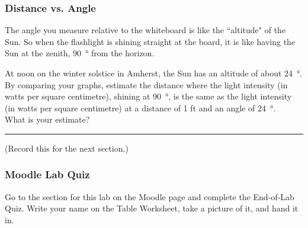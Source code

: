 \documentclass[main.tex]{subfiles}
\begin{document}
\subsubsection{Distance vs. Angle}
The angle you measure relative to the whiteboard is like the ``altitude" of the Sun. So when the flashlight is shining straight at the board, it is like having the Sun at the zenith, \SI{90}{\degree} from the horizon.

At noon on the winter solstice in Amherst, the Sun has an altitude of about \SI{24}{\degree}. By comparing your graphs, estimate the distance where the light intensity (in watts per square centimetre), shining at \SI{90}{\degree}, is the same as the light intensity (in watts per square centimetre) at a distance of 1 ft and an angle of \SI{24}{\degree}.\\

What is your estimate? \rule{5cm}{.15mm} (Record this for the next section.)

\subsubsection{Moodle Lab Quiz}
Go to the section for this lab on the Moodle page and complete the End-of-Lab Quiz. Write your name on the Table Worksheet, take a picture of it, and hand it in.

\end{document}
